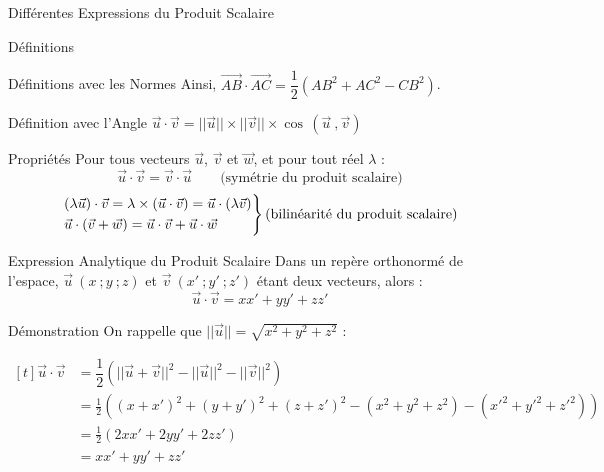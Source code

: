 \documentclass{coursbook}
\begin{document}
\begin{Gpartie}{Différentes Expressions du Produit Scalaire}
\begin{Spartie}{Définitions}
\begin{SSpartie}{Définitions avec les Normes}
                Ainsi, $\overrightarrow{AB}\cdot\overrightarrow{AC}=\dfrac{1}{2}\left(AB^2+AC^2-CB^2\right)$.
            \end{SSpartie}
            \begin{SSpartie}{Définition avec l'Angle} 
                $\vec{u}\cdot\vec{v}=\lvert\lvert\vec{u}\rvert\rvert\times\lvert\lvert\vec{v}\rvert\rvert\times\cos\,\left(\vec{u}~,\vec{v}\right)$
            \end{SSpartie}
        \end{Spartie}
        \begin{Spartie}{Propriétés} 
            Pour tous vecteurs $\vec{u}$, $\vec{v}$ et $\vec{w}$, et pour tout réel $\lambda$ : \[\vec{u}\cdot\vec{v}=\vec{v}\cdot\vec{u}\qquad\text{(symétrie du produit scalaire)}\] \[\begin{drcases}\left(\lambda\vec{u}\right)\cdot\vec{v}=\lambda\times\left(\vec{u}\cdot\vec{v}\right)=\vec{u}\cdot\left(\lambda\vec{v}\right) \\ \vec{u}\cdot\left(\vec{v}+\vec{w}\right)=\vec{u}\cdot\vec{v}+\vec{u}\cdot\vec{w}\end{drcases}\text{(bilinéarité du produit scalaire)}\]
        \end{Spartie}
        \begin{Spartie}{Expression Analytique du Produit Scalaire} 
            Dans un repère orthonormé de l'espace, $\vec{u}~\left(x~;y~;z\right)$ et $\vec{v}~\left(x'~;y'~;z'\right)$ étant deux vecteurs, alors : \[\vec{u}\cdot\vec{v}=xx'+yy'+zz'\] 
            \begin{SSpartie}{Démonstration} 
                On rappelle que $\lvert\lvert\vec{u}\rvert\rvert=\sqrt{x^2+y^2+z^2}$ :

                $\begin{aligned}[t]
                    \vec{u}\cdot\vec{v}&=\dfrac{1}{2}\left(\lvert\lvert\vec{u}+\vec{v}\rvert\rvert^2-\lvert\lvert\vec{u}\rvert\rvert^2-\lvert\lvert\vec{v}\rvert\rvert^2\right) \\
                    &=\frac{1}{2}\left(\left(x+x'\right)^2+\left(y+y'\right)^2+\left(z+z'\right)^2-\left(x^2+y^2+z^2\right)-\left(x'^2+y'^2+z'^2\right)\right) \\
                    &=\frac{1}{2}\left(2xx'+2yy'+2zz'\right) \\
                    &=xx'+y y'+z z'
                \end{aligned}$
            \end{SSpartie}
        \end{Spartie}
    \end{Gpartie} \pagebreak
\end{document}
